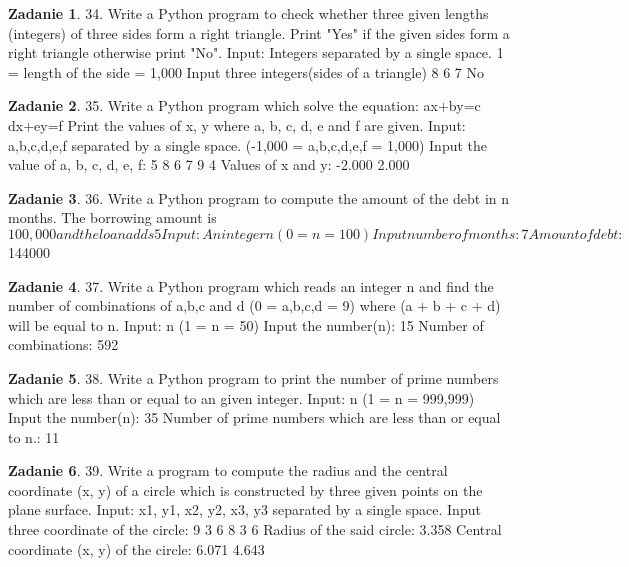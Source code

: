 \documentclass[11pt]{article}
\theoremstyle{definition}
\newtheorem{zadanie}{Zadanie}
\begin{document}
\begin{zadanie}


34. Write a Python program to check whether three given lengths (integers) of three sides form a right triangle. Print "Yes" if the given sides form a right triangle otherwise print "No". 
Input:
Integers separated by a single space.
1 = length of the side = 1,000
Input three integers(sides of a triangle)
8 6 7
No

\end{zadanie}

\begin{zadanie}


35. Write a Python program which solve the equation: 
ax+by=c
dx+ey=f
Print the values of x, y where a, b, c, d, e and f are given.
Input:
a,b,c,d,e,f separated by a single space.
(-1,000 = a,b,c,d,e,f = 1,000)
Input the value of a, b, c, d, e, f:
5 8 6 7 9 4
Values of x and y:
-2.000 2.000

\end{zadanie}

\begin{zadanie}


36. Write a Python program to compute the amount of the debt in n months. The borrowing amount is $100,000 and the loan adds 5%
Input:
An integer n (0 = n = 100)
Input number of months:
7 Amount of debt: $144000

\end{zadanie}

\begin{zadanie}


37. Write a Python program which reads an integer n and find the number of combinations of a,b,c and d (0 = a,b,c,d = 9) where (a + b + c + d) will be equal to n. 
Input:
n (1 = n = 50)
Input the number(n):
15
Number of combinations: 592

\end{zadanie}

\begin{zadanie}


38. Write a Python program to print the number of prime numbers which are less than or equal to an given integer. 
Input:
n (1 = n = 999,999)
Input the number(n):
35
Number of prime numbers which are less than or equal to n.: 11

\end{zadanie}

\begin{zadanie}


39. Write a program to compute the radius and the central coordinate (x, y) of a circle which is constructed by three given points on the plane surface. 
Input:
x1, y1, x2, y2, x3, y3 separated by a single space.
Input three coordinate of the circle:
9 3 6 8 3 6
Radius of the said circle:
3.358
Central coordinate (x, y) of the circle:
6.071 4.643

\end{zadanie}
\end{document}
